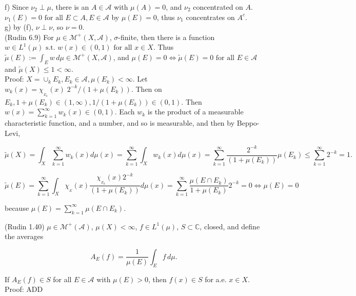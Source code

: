 \documentclass[12pt]{article}
\newcommand{\st}[0]{ \textrm{ s.t. } }
\newcommand{\fall}[0] { \textrm{ for all } }
\newcommand{\complexes}[0] { \mathbb{C}}
\newcommand{\A}[0] { \mathcal{A} }
\newcommand{\M}[0] { \mathcal{M} }
\newcommand{\lrimply}[0] { \Leftrightarrow }
\begin{document}
\noindent
f) Since $\nu_2 \perp \mu$, there is an $A \in \A$ with $\mu(A) = 0$, and $\nu_2$ concentrated on $A$. $\nu_1(E) = 0 \fall E \subset A, E \in \A$ by $\mu(E) = 0$, thus $\nu_1$ concentrates on $A^c$.  \\

\noindent
g) by (f), $\nu \perp \nu$, so $\nu = 0$.  \\


(Rudin 6.9) For $\mu \in \M^+(X, \A)$, $\sigma$-finite, then there is a function $w \in L^1(\mu) \st w(x) \in (0,1) \fall x \in X$. Thus $\tilde{\mu}(E) := \int_E w \, d\mu \in \M^+(X, \A)$, and $\mu(E) = 0 \lrimply \tilde{\mu}(E)=0 \fall E \in \A$   and $ \tilde{\mu}(X) \le 1 < \infty$. \\

\noindent
Proof: $X = \cup_k E_k, E_k \in \A, \mu(E_k) < \infty$. Let $w_k(x) = \chi_{_{E_k}}(x) \; 2^{-k}/ (1+\mu(E_k))$. Then on $E_k, 1+\mu(E_k) \in (1,\infty), 1/ (1+\mu(E_k)) \in (0,1)$. Then $w(x) = \sum_{k=1}^\infty w_k(x) \in (0,1)$. Each $w_k$ is the product of a measurable characteristic function, and a number, and so is measurable, and then by Beppo-Levi,

$$
    \tilde{\mu}(X) =  \int_X \sum_{k=1}^\infty w_k(x) d\mu(x) =  \sum_{k=1}^\infty  \int_X w_k(x) d\mu(x) =  \sum_{k=1}^\infty   \frac{2^{-k}}{ (1+\mu(E_k))}     \mu(E_k) \le \sum_{k=1}^\infty 2^{-k} = 1.
$$

$$
    \tilde{\mu}(E) =  \sum_{k=1}^\infty  \int_X \chi_{_{E}}(x) \frac{ \chi_{_{E_k}}(x)  2^{-k}}{ (1+\mu(E_k))} d\mu(x) = \sum_{k=1}^\infty \frac{ \mu(E \cap E_k ) }{ 1+\mu(E_k)} 2^{-k} = 0 \lrimply \mu(E) = 0
$$

\noindent
because $\mu(E) = \sum_{k=1}^\infty \mu(E \cap E_k)$.


\vspace{20pt}

(Rudin 1.40) $\mu \in \M^+(\A)$, $\mu(X) < \infty$, $f \in L^1(\mu)$, $S \subset \complexes$, closed, and define the averages

$$
A_E(f) = \frac{1}{\mu(E)}  \int_E f \, d\mu.
$$

\noindent
If $A_E(f) \in S$ for all $E \in \A$ with $\mu(E) > 0$, then $f(x) \in S$ for a.e. $x \in X$.\\


\noindent
Proof: ADD \\






\break
\end{document}
